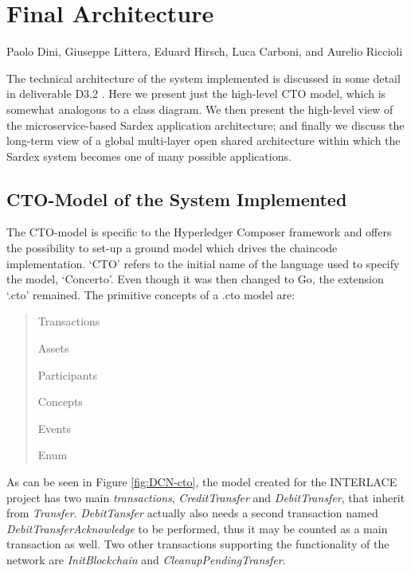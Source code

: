 \chapter{Final Architecture}
\label{ch:finarch}

\vspace{-1cm}
\begin{center}
Paolo Dini, Giuseppe Littera, Eduard Hirsch, Luca Carboni, and Aurelio Riccioli
\end{center}

The technical architecture of the system implemented is discussed in some detail in deliverable D3.2 \cite{INTERLACE_D32}. Here we present just the high-level CTO model, which is somewhat analogous to a class diagram. We then present the high-level view of the microservice-based Sardex application architecture; and finally we discuss the long-term view of a global multi-layer open shared architecture within which the Sardex system becomes one of many possible applications.

\section{CTO-Model of the System Implemented}
\label{sec:cto-model}

The CTO-model is specific to the Hyperledger Composer framework and offers the possibility to set-up a ground model which drives the chaincode implementation. `CTO' refers to the initial name of the language used to specify the model, `Concerto'. Even though it was then changed to Go, the extension `.cto' remained. The primitive concepts of a .cto model are:
\begin{quote}
\begin{packed_item1}
\item Transactions
\item Assets
\item Participants
\item Concepts
\item Events
\item Enum
\end{packed_item1}
\end{quote}

As can be seen in Figure \ref{fig:DCN-cto}, the model created for the INTERLACE project has two main \textit{transactions}, \textit{CreditTransfer} and \textit{DebitTransfer}, that inherit from \textit{Transfer}. \textit{DebitTansfer} actually also needs a second transaction named \textit{DebitTransferAcknowledge} to be performed, thus it may be counted as a main transaction as well. Two other transactions supporting the functionality of the network are \textit{InitBlockchain} and \textit{CleanupPendingTransfer}.

